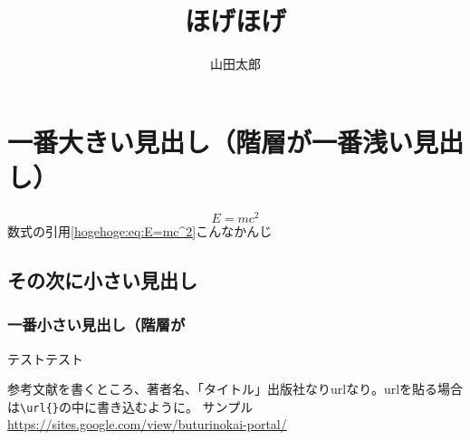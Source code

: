 \documentclass[a4paper,oneside]{jsbook}
\begin{document}
\title{ほげほげ}
\author{山田太郎}
\date{}%
\maketitle


\section{一番大きい見出し（階層が一番浅い見出し）}
\begin{equation}
  E=mc^2\label{hogehoge:eq:E=mc^2}
\end{equation}
数式の引用\eqref{hogehoge:eq:E=mc^2}こんなかんじ

\subsection{その次に小さい見出し}

\subsubsection{一番小さい見出し（階層が}
テストテスト






\let\oldaddcontentsline\addcontentsline%
\renewcommand{\addcontentsline}[3]{}
\begin{thebibliography}{99}
    参考文献を書くところ、著者名、「タイトル」出版社なりurlなり。urlを貼る場合は\verb|\url{}|の中に書き込むように。
    サンプル\url{https://sites.google.com/view/buturinokai-portal/}
\end{thebibliography}
\let\addcontentsline\oldaddcontentsline
\end{document}
